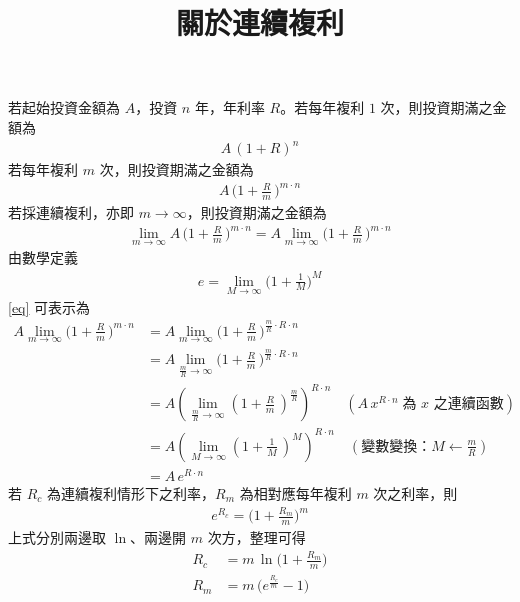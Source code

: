 \documentclass[14pt]{extarticle}
\theoremstyle{definition}
\begin{document}
\title{\texorpdfstring{\vspace{-1em} 關於連續複利}{關於連續複利}} 
\author{\vspace{-5em}}
\date{\vspace{-5em}}
\maketitle
\vspace{1cm}
\noindent
若起始投資金額為 $A$，投資 $n$ 年，年利率 $R$。若每年複利 $1$ 次，則投資期滿之金額為
\begin{align*}
  A\,(1 + R)^n
\end{align*}
若每年複利 $m$ 次，則投資期滿之金額為
\begin{align*}
  A\,\Big(1 + \frac{R}{m}\,\Big)^{m\cdot n}
\end{align*}
若採連續複利，亦即 $m\to\infty$，則投資期滿之金額為
\begin{align}\label{eq}
  \lim_{m\to\infty}A\,\Big(1 + \frac{R}{m}\,\Big)^{m\cdot n} = A\lim_{m\to\infty}\Big(1 + \frac{R}{m}\,\Big)^{m\cdot n}
\end{align}
由數學定義
\begin{align*}
  e = \lim_{M\to\infty}\Big(1 + \frac{1}{M}\Big)^M
\end{align*}
\eqref{eq} 可表示為
\begin{align*}
  A\lim_{m\to\infty}\Big(1 + \frac{R}{m}\,\Big)^{m\cdot n} 
  &= A\lim_{m\to\infty}\Big(1 + \frac{R}{m}\,\Big)^{\frac{m}{R}\cdot R\cdot n} \\
  &= A\lim_{\frac{m}{R}\to\infty}\Big(1 + \frac{R}{m}\,\Big)^{\frac{m}{R}\cdot R\cdot n} \\
  &= A\left(\lim_{\frac{m}{R}\to\infty}\left(1 + \frac{R}{m}\,\right)^{\frac{m}{R}}\right)^{R\cdot n}\quad(A\,x^{R\cdot n}\;\text{為 $x$ 之連續函數})\\
  &= A\left(\lim_{M\to\infty}\left(1 + \frac{1}{M}\,\right)^M\right)^{R\cdot n}\quad(\text{變數變換：} M\longleftarrow\frac{m}{R})\\
  &= A\,e^{R\cdot n} 
\end{align*}
若 $R_c$ 為連續複利情形下之利率，$R_m$ 為相對應每年複利 $m$ 次之利率，則
\begin{align*}
  e^{R_c} = \Big(1 + \frac{R_m}{m}\Big)^m
\end{align*}
上式分別兩邊取 $\ln$、兩邊開 $m$ 次方，整理可得
\begin{align*}
  R_c &= m\,\ln\Big(1 + \frac{R_m}{m}\Big) \\
  R_m &= m\,\big(e^{\frac{R_c}{m}} - 1\big)
\end{align*}

%
%
\end{document}
